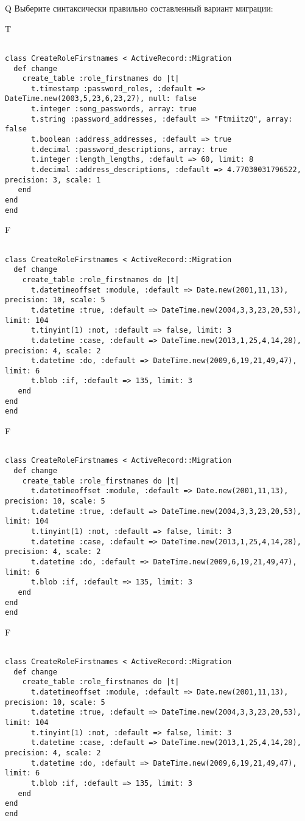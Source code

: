Q
Выберите синтаксически правильно составленный вариант миграции:

T
\begin{verbatim}
		
class CreateRoleFirstnames < ActiveRecord::Migration 
  def change 
    create_table :role_firstnames do |t| 
      t.timestamp :password_roles, :default => DateTime.new(2003,5,23,6,23,27), null: false
      t.integer :song_passwords, array: true
      t.string :password_addresses, :default => "FtmiitzQ", array: false
      t.boolean :address_addresses, :default => true
      t.decimal :password_descriptions, array: true
      t.integer :length_lengths, :default => 60, limit: 8
      t.decimal :address_descriptions, :default => 4.77030031796522, precision: 3, scale: 1
   end
end
end
\end{verbatim}

F
\begin{verbatim}
		
class CreateRoleFirstnames < ActiveRecord::Migration 
  def change 
    create_table :role_firstnames do |t| 
      t.datetimeoffset :module, :default => Date.new(2001,11,13), precision: 10, scale: 5
      t.datetime :true, :default => DateTime.new(2004,3,3,23,20,53), limit: 104
      t.tinyint(1) :not, :default => false, limit: 3
      t.datetime :case, :default => DateTime.new(2013,1,25,4,14,28), precision: 4, scale: 2
      t.datetime :do, :default => DateTime.new(2009,6,19,21,49,47), limit: 6
      t.blob :if, :default => 135, limit: 3
   end
end
end
\end{verbatim}

F
\begin{verbatim}
		
class CreateRoleFirstnames < ActiveRecord::Migration 
  def change 
    create_table :role_firstnames do |t| 
      t.datetimeoffset :module, :default => Date.new(2001,11,13), precision: 10, scale: 5
      t.datetime :true, :default => DateTime.new(2004,3,3,23,20,53), limit: 104
      t.tinyint(1) :not, :default => false, limit: 3
      t.datetime :case, :default => DateTime.new(2013,1,25,4,14,28), precision: 4, scale: 2
      t.datetime :do, :default => DateTime.new(2009,6,19,21,49,47), limit: 6
      t.blob :if, :default => 135, limit: 3
   end
end
end
\end{verbatim}

F
\begin{verbatim}
		
class CreateRoleFirstnames < ActiveRecord::Migration 
  def change 
    create_table :role_firstnames do |t| 
      t.datetimeoffset :module, :default => Date.new(2001,11,13), precision: 10, scale: 5
      t.datetime :true, :default => DateTime.new(2004,3,3,23,20,53), limit: 104
      t.tinyint(1) :not, :default => false, limit: 3
      t.datetime :case, :default => DateTime.new(2013,1,25,4,14,28), precision: 4, scale: 2
      t.datetime :do, :default => DateTime.new(2009,6,19,21,49,47), limit: 6
      t.blob :if, :default => 135, limit: 3
   end
end
end
\end{verbatim}

